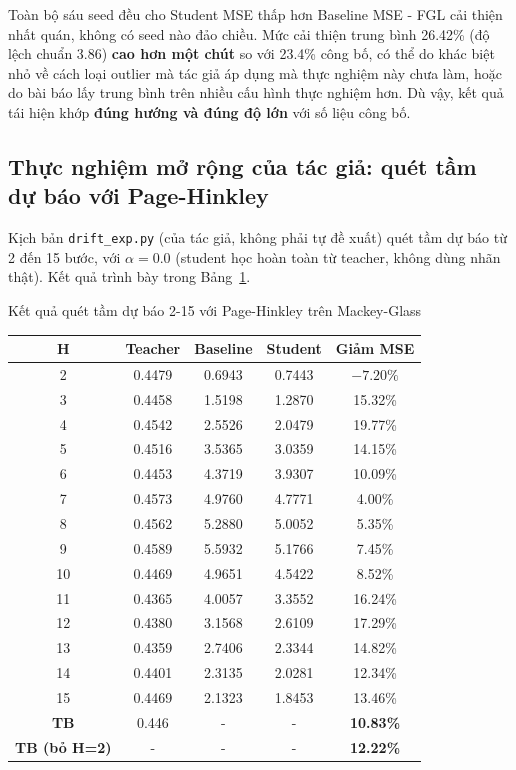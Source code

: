 Toàn bộ sáu seed đều cho Student MSE thấp hơn Baseline MSE - FGL cải thiện nhất quán, không
có seed nào đảo chiều. Mức cải thiện trung bình 26.42\% (độ lệch chuẩn 3.86) \textbf{cao hơn
một chút} so với 23.4\% công bố, có thể do khác biệt nhỏ về cách loại outlier mà tác giả áp dụng mà thực nghiệm
này chưa làm, hoặc do bài báo lấy trung bình trên nhiều cấu hình thực nghiệm hơn. Dù vậy, kết
quả tái hiện khớp \textbf{đúng hướng và đúng độ lớn} với số liệu công bố.

\subsection{Thực nghiệm mở rộng của tác giả: quét tầm dự báo với Page-Hinkley}

Kịch bản \texttt{drift\_exp.py} (của tác giả, không phải tự đề xuất) quét tầm dự báo từ 2 đến
15 bước, với $\alpha = 0.0$ (student học hoàn toàn từ teacher, không dùng nhãn thật). Kết quả
trình bày trong Bảng~\ref{bang:mg-drift}.

\begin{table}[H]{Kết quả quét tầm dự báo 2-15 với Page-Hinkley trên Mackey-Glass}
	\label{bang:mg-drift}
	\centering
	\small
	\begin{tabular}{ccccc}
		\toprule
		\textbf{H} & \textbf{Teacher} & \textbf{Baseline} & \textbf{Student} & \textbf{Giảm MSE} \\
		\midrule
		2  & 0.4479 & 0.6943 & 0.7443 & $-7.20\%$ \\
		3  & 0.4458 & 1.5198 & 1.2870 & 15.32\% \\
		4  & 0.4542 & 2.5526 & 2.0479 & 19.77\% \\
		5  & 0.4516 & 3.5365 & 3.0359 & 14.15\% \\
		6  & 0.4453 & 4.3719 & 3.9307 & 10.09\% \\
		7  & 0.4573 & 4.9760 & 4.7771 & 4.00\% \\
		8  & 0.4562 & 5.2880 & 5.0052 & 5.35\% \\
		9  & 0.4589 & 5.5932 & 5.1766 & 7.45\% \\
		10 & 0.4469 & 4.9651 & 4.5422 & 8.52\% \\
		11 & 0.4365 & 4.0057 & 3.3552 & 16.24\% \\
		12 & 0.4380 & 3.1568 & 2.6109 & 17.29\% \\
		13 & 0.4359 & 2.7406 & 2.3344 & 14.82\% \\
		14 & 0.4401 & 2.3135 & 2.0281 & 12.34\% \\
		15 & 0.4469 & 2.1323 & 1.8453 & 13.46\% \\
		\midrule
		\textbf{TB} & 0.446 & - & - & \textbf{10.83\%} \\
		\textbf{TB (bỏ H=2)} & - & - & - & \textbf{12.22\%} \\
		\bottomrule
	\end{tabular}
\end{table}

